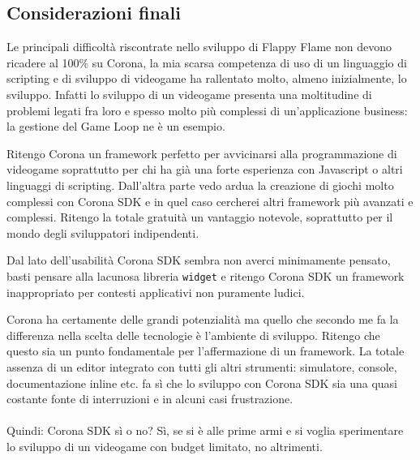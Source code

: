 		
		\subsection{Considerazioni finali}
			Le principali difficoltà riscontrate nello sviluppo di Flappy Flame non devono ricadere al 100\% su Corona, la mia scarsa competenza di uso di un linguaggio di scripting e di sviluppo di videogame ha rallentato molto, almeno inizialmente, lo sviluppo. Infatti lo sviluppo di un videogame presenta una moltitudine di problemi legati fra loro e spesso molto più complessi di un’applicazione business: la gestione del Game Loop ne è un esempio.
			
			Ritengo Corona un framework perfetto per avvicinarsi alla programmazione di videogame soprattutto per chi ha già una forte esperienza con Javascript o altri linguaggi di scripting. Dall'altra parte vedo ardua la creazione di giochi molto complessi con Corona SDK e in quel caso cercherei altri framework più avanzati e complessi. Ritengo la totale gratuità un vantaggio notevole, soprattutto per il mondo degli sviluppatori indipendenti. 
			
			Dal lato dell'usabilità Corona SDK sembra non averci minimamente pensato, basti pensare alla lacunosa libreria \verb|widget| e ritengo Corona SDK un framework inappropriato per contesti applicativi non puramente ludici.
			
			Corona ha certamente delle grandi potenzialità ma quello che secondo me fa la differenza nella scelta delle tecnologie è l’ambiente di sviluppo. Ritengo che questo sia un punto fondamentale per l’affermazione di un framework. La totale assenza di un editor integrato con tutti gli altri strumenti: simulatore, console, documentazione inline etc. fa sì che lo sviluppo con Corona SDK sia una quasi costante fonte di interruzioni e in alcuni casi frustrazione.
			
			\paragraph{} Quindi: Corona SDK sì o no? Sì, se si è alle prime armi e si voglia sperimentare lo sviluppo di un videogame con budget limitato, no altrimenti.
			
		

